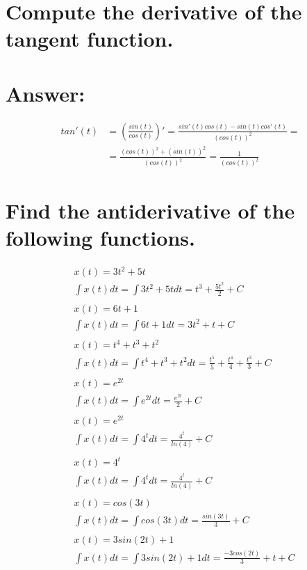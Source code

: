 \documentclass{article}
\begin{document}
\section*{Compute the derivative of the tangent function.}

\section*{Answer: }

\begin{equation}
\begin{split}
tan'(t) & = (\frac{sin(t)}{cos(t)})' = \frac{sin'(t)cos(t) - sin(t)cos'(t)}{(cos(t))^2} = \\ 
& =\frac{(cos(t))^2 + (sin(t))^2}{(cos(t))^2} = \frac{1}{(cos(t))^2}
\end{split}
\end{equation}

\section{\normalfont Find the antiderivative of the following functions.}

\begin{equation}
\begin{split}
& x(t) = 3t^2 + 5t \\
& \int x(t) dt = \int 3t^2 + 5t dt = t^3 + \frac{5t^2}{2} + C \\ \\
& x(t) = 6t + 1 \\
& \int x(t) dt = \int 6t + 1 dt = 3t^2 + t + C \\ \\
& x(t) = t^4 + t^3 + t^2 \\
& \int x(t) dt = \int t^4 + t^3 + t^2 dt = \frac{t^5}{5} + \frac{t^4}{4} + \frac{t^3}{3} + C \\ \\
& x(t) = e^{2t} \\
& \int x(t) dt = \int e^{2t} dt = \frac{e^{2t}}{2} + C \\ \\
& x(t) = e^{2t} \\
& \int x(t) dt = \int 4^t dt = \frac{4^t}{ln(4)} + C \\ \\
& x(t) = 4^t \\
& \int x(t) dt = \int 4^t dt = \frac{4^t}{ln(4)} + C \\ \\
& x(t) = cos(3t) \\
& \int x(t) dt = \int cos(3t) dt = \frac{sin(3t)}{3} + C \\ \\
& x(t) = 3sin(2t) + 1 \\
& \int x(t) dt = \int 3sin(2t) + 1 dt = \frac{-3cos(2t)}{3} + t + C \\ \\
\end{split}
\end{equation}
\end{document}
